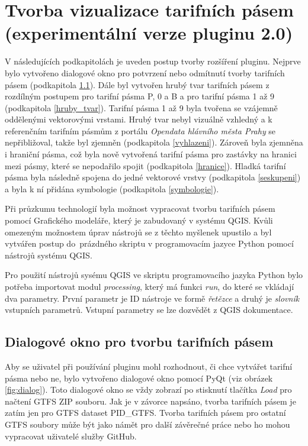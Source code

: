 \section{Tvorba vizualizace tarifních pásem (experimentální verze pluginu 2.0)}

V následujících podkapitolách je uveden postup tvorby rozšíření pluginu.
Nejprve bylo vytvořeno dialogové okno pro potvrzení nebo odmítnutí tvorby tarifních pásem (podkapitola \ref{dialog}).
Dále byl vytvořen hrubý tvar tarifních pásem z rozdílným po\-stupem pro tarifní pásma P, 0 a B
a pro tarifní pásma 1 až 9 (podkapitola \ref{hruby_tvar}). 
Tarifní pásma 1 až 9 byla tvořena se vzájemně oddělenými vektorovými vrstami.
Hrubý tvar nebyl vizuálně vzhledný a k referenčním tarifním pásmům
z portálu \textit{Opendata hlávního města Prahy} se nepřibližoval, takže byl zjemněn (podkapitola \ref{vyhlazeni}).
Zároveň byla zjemněna i hraniční pásma, což byla nově vytvořená tarifní pásma pro zastávky
na hranici mezi pásmy, které se nepodařilo spojit (podkapitola \ref{hranice}). 
Hladká tarifní pásma byla následně spojena do jedné vektorové vrstvy (podkapitola \ref{seskupeni}) a 
byla k ní přidána symbologie (podkapitola \ref{symbologie}).

Při průzkumu technologií byla možnost vypracovat tvorbu tarifních pásem pomocí Grafického modeláře,
který je zabudovaný v systému QGIS.
Kvůli omezeným možnostem úprav nástrojů se z těchto myšlenek upustilo a byl vytvářen postup
do~prázdného skriptu v programovacím jazyce Python pomocí nástrojů systému QGIS.

Pro použití nástrojů sysému QGIS ve skriptu programovacího jazyka Python bylo potřeba importovat modul \textit{processing},
který má funkci \textit{run}, do které se vkládají dva parametry. První parametr je ID nástroje
ve formě \textit{řetězce} a druhý je \textit{slovník} vstupních parametrů. Vstupní parametry se lze dozvědět
z QGIS dokumentace. \cite{QGIS_docs}

\subsection{Dialogové okno pro tvorbu tarifních pásem}
\label{dialog}

Aby se uživatel při používání pluginu mohl rozhodnout, či chce vytvářet tarifní pásma nebo ne, bylo vytvořeno
dialogové okno pomocí PyQt (viz obrázek \ref{fig:dialog}). Toto dialogové okno se vždy zobrazí po stisknutí tlačítka
\textit{Load} pro načtení GTFS ZIP souboru. Jak je v závorce napsáno, tvorba tarifních pásem je zatím jen pro GTFS
dataset PID\_GTFS. Tvorba tarifních pásem pro ostatní GTFS soubory může být jako námět pro další závěrečné práce nebo ho mohou 
vypracovat uživatelé služby GitHub.

